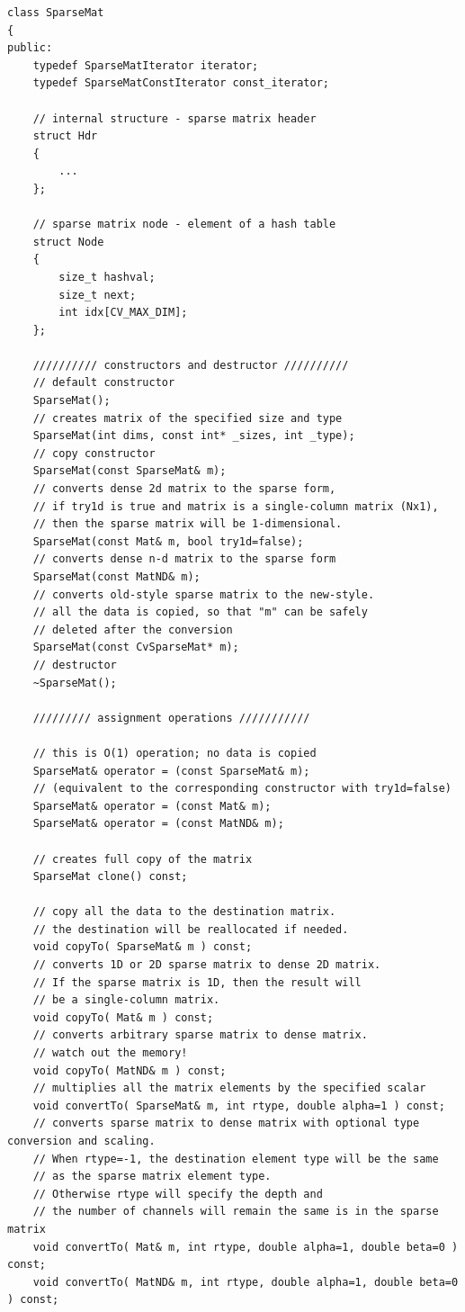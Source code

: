 \begin{lstlisting}
class SparseMat
{
public:
    typedef SparseMatIterator iterator;
    typedef SparseMatConstIterator const_iterator;

    // internal structure - sparse matrix header
    struct Hdr
    {
        ...
    };

    // sparse matrix node - element of a hash table
    struct Node
    {
        size_t hashval;
        size_t next;
        int idx[CV_MAX_DIM];
    };

    ////////// constructors and destructor //////////
    // default constructor
    SparseMat();
    // creates matrix of the specified size and type
    SparseMat(int dims, const int* _sizes, int _type);
    // copy constructor
    SparseMat(const SparseMat& m);
    // converts dense 2d matrix to the sparse form,
    // if try1d is true and matrix is a single-column matrix (Nx1),
    // then the sparse matrix will be 1-dimensional.
    SparseMat(const Mat& m, bool try1d=false);
    // converts dense n-d matrix to the sparse form
    SparseMat(const MatND& m);
    // converts old-style sparse matrix to the new-style.
    // all the data is copied, so that "m" can be safely
    // deleted after the conversion
    SparseMat(const CvSparseMat* m);
    // destructor
    ~SparseMat();
    
    ///////// assignment operations /////////// 
    
    // this is O(1) operation; no data is copied
    SparseMat& operator = (const SparseMat& m);
    // (equivalent to the corresponding constructor with try1d=false)
    SparseMat& operator = (const Mat& m);
    SparseMat& operator = (const MatND& m);

    // creates full copy of the matrix
    SparseMat clone() const;
    
    // copy all the data to the destination matrix.
    // the destination will be reallocated if needed.
    void copyTo( SparseMat& m ) const;
    // converts 1D or 2D sparse matrix to dense 2D matrix.
    // If the sparse matrix is 1D, then the result will
    // be a single-column matrix.
    void copyTo( Mat& m ) const;
    // converts arbitrary sparse matrix to dense matrix.
    // watch out the memory!
    void copyTo( MatND& m ) const;
    // multiplies all the matrix elements by the specified scalar
    void convertTo( SparseMat& m, int rtype, double alpha=1 ) const;
    // converts sparse matrix to dense matrix with optional type conversion and scaling.
    // When rtype=-1, the destination element type will be the same
    // as the sparse matrix element type.
    // Otherwise rtype will specify the depth and
    // the number of channels will remain the same is in the sparse matrix
    void convertTo( Mat& m, int rtype, double alpha=1, double beta=0 ) const;
    void convertTo( MatND& m, int rtype, double alpha=1, double beta=0 ) const;


\end{lstlisting}
